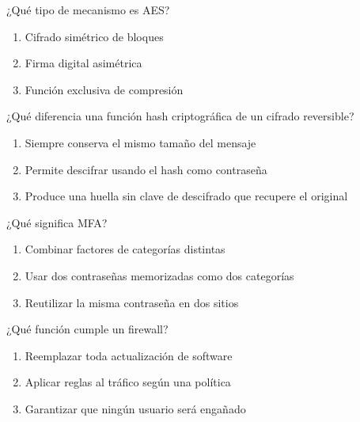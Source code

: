 \noindent\begin{minipage}{\linewidth}\setlength{\parskip}{4pt}\label{q:R-064}
¿Qué tipo de mecanismo es AES?
\begin{enumerate}[label=\Alph*),nosep]
\item Cifrado simétrico de bloques
\item Firma digital asimétrica
\item Función exclusiva de compresión
\end{enumerate}\end{minipage}\par\medskip

\noindent\begin{minipage}{\linewidth}\setlength{\parskip}{4pt}\label{q:R-065}
¿Qué diferencia una función hash criptográfica de un cifrado reversible?
\begin{enumerate}[label=\Alph*),nosep]
\item Siempre conserva el mismo tamaño del mensaje
\item Permite descifrar usando el hash como contraseña
\item Produce una huella sin clave de descifrado que recupere el original
\end{enumerate}\end{minipage}\par\medskip

\noindent\begin{minipage}{\linewidth}\setlength{\parskip}{4pt}\label{q:R-066}
¿Qué significa MFA?
\begin{enumerate}[label=\Alph*),nosep]
\item Combinar factores de categorías distintas
\item Usar dos contraseñas memorizadas como dos categorías
\item Reutilizar la misma contraseña en dos sitios
\end{enumerate}\end{minipage}\par\medskip

\noindent\begin{minipage}{\linewidth}\setlength{\parskip}{4pt}\label{q:R-067}
¿Qué función cumple un firewall?
\begin{enumerate}[label=\Alph*),nosep]
\item Reemplazar toda actualización de software
\item Aplicar reglas al tráfico según una política
\item Garantizar que ningún usuario será engañado
\end{enumerate}\end{minipage}\par\medskip

